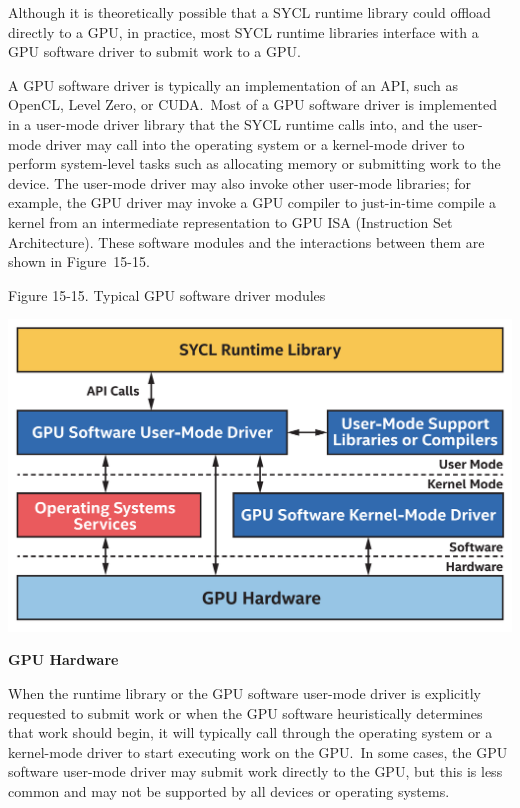Although it is theoretically possible that a SYCL runtime library could offload directly to a GPU, in practice, most SYCL runtime libraries interface with a GPU software driver to submit work to a GPU.\par

A GPU software driver is typically an implementation of an API, such as OpenCL, Level Zero, or CUDA. Most of a GPU software driver is implemented in a user-mode driver library that the SYCL runtime calls into, and the user-mode driver may call into the operating system or a kernel-mode driver to perform system-level tasks such as allocating memory or submitting work to the device. The user-mode driver may also invoke other user-mode libraries; for example, the GPU driver may invoke a GPU compiler to just-in-time compile a kernel from an intermediate representation to GPU ISA (Instruction Set Architecture). These software modules and the interactions between them are shown in Figure 15-15.\par

\hspace*{\fill} \par %
Figure 15-15. Typical GPU software driver modules
\begin{center}
	\includegraphics[width=1.0\textwidth]{content/chapter-15/images/11}
\end{center}

\hspace*{\fill} \par %
\textbf{GPU Hardware}

When the runtime library or the GPU software user-mode driver is explicitly requested to submit work or when the GPU software heuristically determines that work should begin, it will typically call through the operating system or a kernel-mode driver to start executing work on the GPU. In some cases, the GPU software user-mode driver may submit work directly to the GPU, but this is less common and may not be supported by all devices or operating systems.\par

